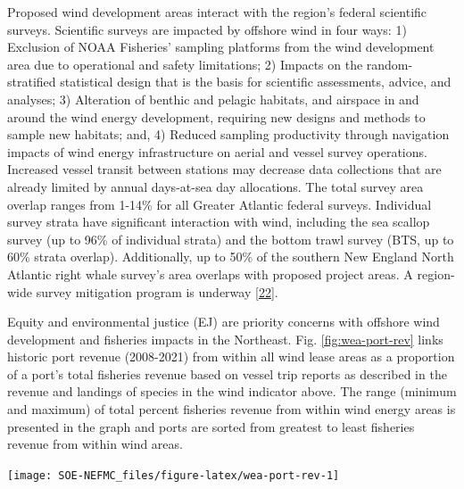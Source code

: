 \documentclass[
  10pt,
]{article}
\let\origfigure\figure
\let\endorigfigure\endfigure
\renewenvironment{figure}[1][2] {
    \expandafter\origfigure\expandafter[H]
} {
    \endorigfigure
}
\begin{document}
Proposed wind development areas interact with the region's federal scientific surveys. Scientific surveys are impacted by offshore wind in four ways: 1) Exclusion of NOAA Fisheries' sampling platforms from the wind development area due to operational and safety limitations; 2) Impacts on the random-stratified statistical design that is the basis for scientific assessments, advice, and analyses; 3) Alteration of benthic and pelagic habitats, and airspace in and around the wind energy development, requiring new designs and methods to sample new habitats; and, 4) Reduced sampling productivity through navigation impacts of wind energy infrastructure on aerial and vessel survey operations. Increased vessel transit between stations may decrease data collections that are already limited by annual days-at-sea day allocations. The total survey area overlap ranges from 1-14\% for all Greater Atlantic federal surveys. Individual survey strata have significant interaction with wind, including the sea scallop survey (up to 96\% of individual strata) and the bottom trawl survey (BTS, up to 60\% strata overlap). Additionally, up to 50\% of the southern New England North Atlantic right whale survey's area overlaps with proposed project areas. A region-wide survey mitigation program is underway {[}\protect\hyperlink{ref-northeast_fisheries_science_center_us_noaa_2022}{22}{]}.

Equity and environmental justice (EJ) are priority concerns with offshore wind development and fisheries impacts in the Northeast. Fig. \ref{fig:wea-port-rev} links historic port revenue (2008-2021) from within all wind lease areas as a proportion of a port's total fisheries revenue based on vessel trip reports as described in the revenue and landings of species in the wind indicator above. The range (minimum and maximum) of total percent fisheries revenue from within wind energy areas is presented in the graph and ports are sorted from greatest to least fisheries revenue from within wind areas.

\begin{figure}

\texttt{[image: SOE-NEFMC\_files/figure-latex/wea-port-rev-1]} \hfill{}

\caption{Percent of port fisheries revenue from Wind Energy Areas (WEA) in descending order from most to least port fisheries revenue from WEA. EJ = Environmental Justice.}\label{fig:wea-port-rev}
\end{figure}
\end{document}
